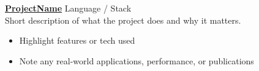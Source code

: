 \vspace{2mm}

\textbf{\href{https://github.com/yourrepo/project}{ProjectName}} \hfill {Language / Stack} \\
Short description of what the project does and why it matters. \\
\vspace{-2mm}
\begin{itemize} \itemsep -2pt
    \item Highlight features or tech used
    \item Note any real-world applications, performance, or publications
\end{itemize}
